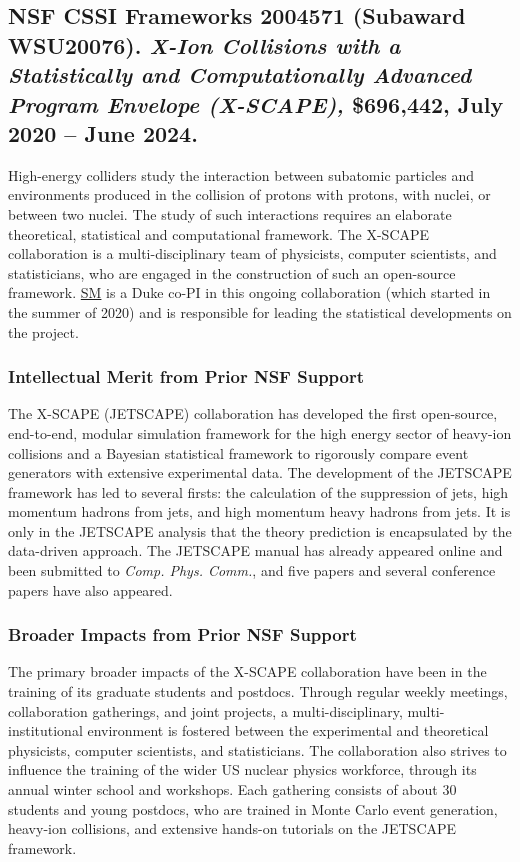 \documentclass[11pt]{NSFamsart}
\newcommand{\cmtS}[1]{{\color{blue}{(Simon: #1)}}}
\newcommand{\SM}{\hyperlink{SMlink}{SM}\xspace}
\begin{document}
\subsection{NSF CSSI Frameworks 2004571 (Subaward WSU20076). \cmtS{to add} \textit{X-Ion Collisions with a Statistically and Computationally Advanced Program Envelope (X-SCAPE),} \$696,442, July 2020 -- June 2024.} High-energy colliders study the interaction between subatomic particles and environments produced in the collision of protons with protons, with nuclei, or between two nuclei. The study of such interactions requires an elaborate theoretical, statistical and computational framework. The X-SCAPE collaboration is a multi-disciplinary team of physicists, computer scientists, and statisticians, who are engaged in the construction of such an open-source framework. \SM is a Duke co-PI in this ongoing collaboration (which started in the summer of 2020) and is responsible for leading the statistical developments on the project.

\subsubsection{Intellectual Merit from Prior NSF Support}

The X-SCAPE (JETSCAPE) collaboration has developed the first open-source, end-to-end, modular simulation framework for the high energy sector of heavy-ion collisions and a Bayesian statistical framework to rigorously compare event generators with extensive experimental data. The development of the JETSCAPE framework has led to several firsts: the calculation of the suppression of jets, high momentum hadrons from jets, and high momentum heavy hadrons from jets. It is only in the JETSCAPE analysis that the theory prediction is encapsulated by the data-driven approach. The JETSCAPE manual has already appeared online and been submitted to \textit{Comp. Phys. Comm.}, and five papers \cite{cao2017multistage,kumar2019jetscape,everett2021multisystem,everett2021phenomenological,cao2021determining} and several conference papers \cite{soltz2018bayesian,tachibana2018jet,kauder2019jetscape,park2019multi} have also appeared.

\subsubsection{Broader Impacts from Prior NSF Support}
The primary broader impacts of the X-SCAPE collaboration have been in the training of its graduate students and postdocs. Through regular weekly meetings, collaboration gatherings, and joint projects, a multi-disciplinary, multi-institutional environment is fostered between the experimental and theoretical physicists, computer scientists, and statisticians. The collaboration also strives to influence the training of the wider US nuclear physics workforce, through its annual winter school and workshops. Each gathering consists of about 30 students and young postdocs, who are trained in Monte Carlo event generation, heavy-ion collisions, and extensive hands-on tutorials on the JETSCAPE framework.
\end{document}
